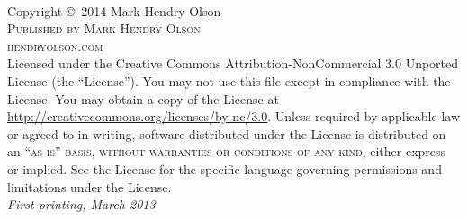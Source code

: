 %
%

\newpage
~\vfill
\thispagestyle{empty}

\noindent Copyright \copyright\ 2014 Mark Hendry Olson\\ %

\noindent \textsc{Published by Mark Hendry Olson}\\ %

\noindent \textsc{hendryolson.com}\\ %

\noindent Licensed under the Creative Commons Attribution-NonCommercial 3.0 Unported License (the ``License''). You may not use this file except in compliance with the License. You may obtain a copy of the License at \url{http://creativecommons.org/licenses/by-nc/3.0}. Unless required by applicable law or agreed to in writing, software distributed under the License is distributed on an \textsc{``as is'' basis, without warranties or conditions of any kind}, either express or implied. See the License for the specific language governing permissions and limitations under the License.\\ %

\noindent \textit{First printing, March 2013} %